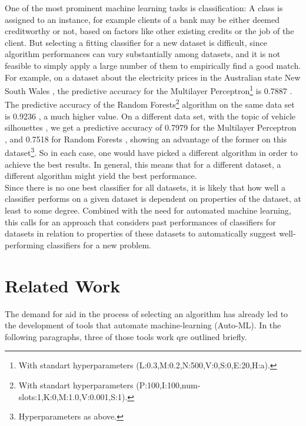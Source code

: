 \documentclass[12pt]{scrartcl}
\begin{document}
One of the most prominent machine learning tasks is classification: A class is assigned to an instance, for example clients of a bank may be either deemed creditworthy or not, based on factors like other existing credits or the job of the client. But selecting a fitting classifier for a new dataset is difficult, since algorithm performances can vary substantially among datasets, and it is not feasible to simply apply a large number of them to empirically find a good match. For example, on a dataset about the electricity prices in the Australian state New South Wales \cite{harris1999splice}, the predictive accuracy for the Multilayer Perceptron\footnote{With standart hyperparameters (L:0.3,M:0.2,N:500,V:0,S:0,E:20,H:a).} is 0.7887 \cite{cachada2017run3}. The predictive accuracy of the Random Forests\footnote{With standart hyperparameters (P:100,I:100,num-slots:1,K:0,M:1.0,V:0.001,S:1).} algorithm on the same data set is 0.9236 \cite{cachada2017run}, a much higher value. On a different data set, with the topic of vehicle silhouettes \cite{siebert1987vehicle}, we get a predictive accuracy of 0.7979 for the Multilayer Perceptron \cite{cachada2017run4}, and 0.7518 for Random Forests \cite{cachada2017run2}, showing an advantage of the former on this dataset\footnote{Hyperparameters as above.}. So in each case, one would have picked a different algorithm in order to achieve the best results. In general, this means that for a different dataset, a different algorithm might yield the best performance.\\
 
Since there is no one best classifier for all datasets, it is likely that how well a classifier performs on a given dataset is dependent on properties of the dataset, at least to some degree. Combined with the need for automated machine learning, this calls for an approach that considers past performances of classifiers for datasets in relation to properties of these datasets to automatically suggest well-performing classifiers for a new problem.

\section{Related Work}\label{sec:related_work}
The demand for aid in the process of selecting an algorithm has already led to the development of tools that automate machine-learning (Auto-ML). In the following paragraphs, three of those tools work qre outlined briefly.\\
\end{document}
